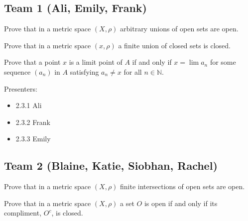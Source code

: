 \subsection*{Team 1 (Ali, Emily, Frank)} 
\par\vspace{1 cm}
\begin{problem*}
Prove that in a metric space $(X,\rho)$ arbitrary unions of open sets are open.  
\end{problem*}
\par\vspace{1 cm}
\begin{problem*}
Prove that in a metric space $(x,\rho)$ a finite union of closed sets is closed.
\end{problem*}
\par\vspace{1 cm}
\begin{problem*}
Prove that a point $x$ is a limit point of $A$ if and only if $x=\lim a_n$ for some sequence $(a_n)$ in $A$ satisfying $a_n\neq x$ for all $n\in\mathbb{N}$. 
\end{problem*}
\par\vspace{1 cm}
Presenters:
\begin{itemize}
\item 2.3.1  Ali
\item 2.3.2  Frank
\item 2.3.3  Emily
\end{itemize}
\subsection*{Team 2 (Blaine, Katie, Siobhan, Rachel)} 
\par\vspace{1 cm}
\begin{problem*}
Prove that in a metric space $(X,\rho)$ finite intersections of open sets are open.
\end{problem*}
\par\vspace{1 cm} 

\begin{problem*}
Prove that in a metric space $(X,\rho)$ a set $O$ is open if and only if its compliment, $O^c$, is closed.
\end{problem*}
\par\vspace{1 cm}

